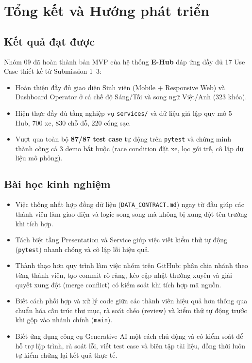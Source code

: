 \section{Tổng kết và Hướng phát triển}

\subsection{Kết quả đạt được}
Nhóm 09 đã hoàn thành bản MVP của hệ thống \textbf{E-Hub} đáp ứng đầy đủ 17 Use Case thiết kế từ Submission 1--3:
\begin{itemize}
    \item Hoàn thiện đầy đủ giao diện Sinh viên (Mobile + Responsive Web) và Dashboard Operator ở cả chế độ Sáng/Tối và song ngữ Việt/Anh (323 khóa).
    \item Hiện thực đầy đủ tầng nghiệp vụ \texttt{services/} và dữ liệu giả lập quy mô 5 Hub, 700 xe, 830 chỗ đỗ, 220 cổng sạc.
    \item Vượt qua toàn bộ \textbf{87/87 test case} tự động trên \texttt{pytest} và chứng minh thành công cả 3 demo bắt buộc (race condition đặt xe, lọc gói trễ, cô lập dữ liệu mô phỏng).
\end{itemize}

\subsection{Bài học kinh nghiệm}
\begin{itemize}
    \item Việc thống nhất hợp đồng dữ liệu (\texttt{DATA\_CONTRACT.md}) ngay từ đầu giúp các thành viên làm giao diện và logic song song mà không bị xung đột tên trường khi tích hợp.
    \item Tách biệt tầng Presentation và Service giúp việc viết kiểm thử tự động (\texttt{pytest}) nhanh chóng và cô lập lỗi hiệu quả.
    \item Thành thạo hơn quy trình làm việc nhóm trên GitHub: phân chia nhánh theo từng thành viên, tạo commit rõ ràng, kéo cập nhật thường xuyên và giải quyết xung đột (merge conflict) có kiểm soát khi tích hợp mã nguồn.
    \item Biết cách phối hợp và xử lý code giữa các thành viên hiệu quả hơn thông qua chuẩn hóa cấu trúc thư mục, rà soát chéo (review) và kiểm thử tự động trước khi gộp vào nhánh chính (\texttt{main}).
    \item Biết ứng dụng công cụ Generative AI một cách chủ động và có kiểm soát để hỗ trợ lập trình, rà soát lỗi, viết test case và biên tập tài liệu, đồng thời luôn tự kiểm chứng lại kết quả thực tế.
\end{itemize}

